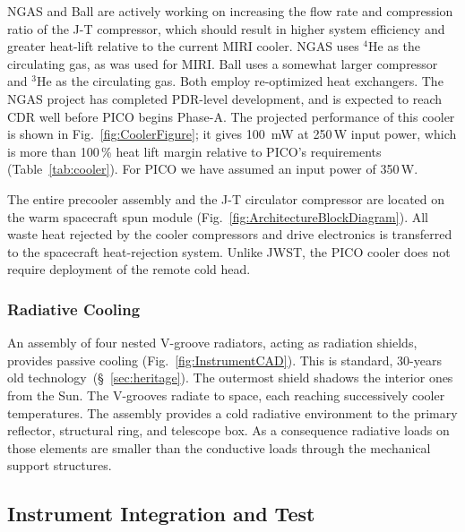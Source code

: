NGAS and Ball are actively working on increasing the flow rate and compression ratio of the J-T compressor,  which should result in higher system efficiency and greater heat-lift relative to the current MIRI cooler.  NGAS uses $^4$He as the circulating gas, as was used for MIRI. Ball uses a somewhat larger compressor and $^3$He as the circulating gas. Both employ re-optimized heat exchangers. The NGAS project has completed PDR-level development, and is expected to reach CDR well before PICO begins Phase-A. The projected performance of this cooler is shown in Fig.~\ref{fig:CoolerFigure}; it gives 100~mW at 250\,W input power, which is more than 100\,\% heat lift margin relative to PICO's requirements (Table~\ref{tab:cooler}). For PICO we have assumed an input power of 350\,W.

The entire precooler assembly and the J-T circulator compressor are located on the warm spacecraft spun module (Fig.~\ref{fig:ArchitectureBlockDiagram}).
All waste heat rejected by the cooler compressors and drive electronics is transferred to the spacecraft heat-rejection system. Unlike JWST, the PICO cooler does not require deployment of the remote cold head.

\subsubsection{Radiative Cooling}
\label{sec:radiative_cooling} %

An assembly of four nested V-groove radiators, acting as radiation shields, provides passive cooling (Fig.~\ref{fig:InstrumentCAD}). This is standard, 30-years old technology~(\S~\ref{sec:heritage}). The outermost shield shadows the interior ones from the Sun. The V-grooves radiate to space, each reaching successively cooler temperatures. The assembly provides a cold radiative environment to the primary reflector, structural ring, and telescope box. As a consequence radiative loads on those elements are smaller than the conductive loads through the mechanical support structures.


\subsection{Instrument Integration and Test}
\label{sec:iandt} %

